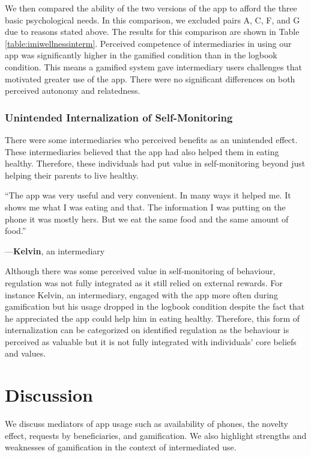 \documentclass{sig-alternate}
\newenvironment{myquote}
               {\list{}{\rightmargin   \leftmargin
                        \parsep        0in }%
                \item\relax}
               {\endlist}
\newcommand{\userquote}[2]{\begin{samepage}\begin{myquote} 
     \em{\small{#2\begin{flushright}---#1\end{flushright}}}
   \end{myquote}\end{samepage}}
\begin{document}
We then compared the ability of the two versions of the app to afford the three basic psychological needs. In this comparison, we excluded pairs A, C, F, and G due to reasons stated above. The results for this comparison are shown in Table \ref{table:imiwellnessinterm}. Perceived competence of intermediaries in using our app was significantly higher in the gamified condition than in the logbook condition. This means a gamified system gave intermediary users challenges that motivated greater use of the app. There were no significant differences on both perceived autonomy and relatedness. 
\subsubsection{Unintended Internalization of Self-Monitoring}
There were some intermediaries who perceived benefits as an unintended effect. These intermediaries believed that the app had also helped them in eating healthy. Therefore, these individuals had put value in self-monitoring beyond just helping their parents to live healthy. 

\userquote{\textbf{Kelvin}, an intermediary} {``The app was very useful and very convenient. In many ways it helped me.  It shows me what I was eating and that. The information I was putting on the phone it was mostly hers. But we eat the same food and the same amount of food.''} 

Although there was some perceived value in self-monitoring of behaviour, regulation was not fully integrated as it still relied on external rewards. For instance Kelvin, an intermediary, engaged with the app more often during gamification but his usage dropped in the logbook condition despite the fact that he appreciated the app could help him in eating healthy. Therefore, this form of internalization can be categorized on identified regulation as the behaviour is perceived as valuable but it is not fully integrated with individuals' core beliefs and values.

\section{Discussion}
We discuss mediators of app usage such as availability of phones, the novelty effect, requests by beneficiaries, and gamification. We also highlight strengths and weaknesses of gamification in the context of intermediated use.
\end{document}
